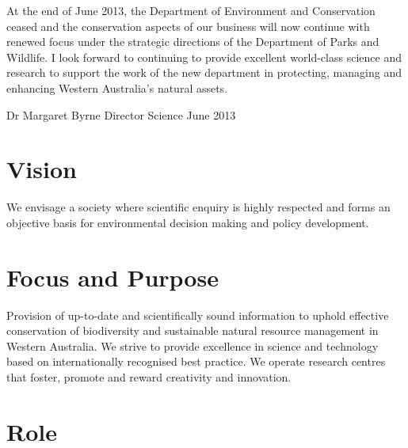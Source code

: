 \documentclass[version=last, paper=a4, DIV=18, usenames, dvipsnames]{scrartcl}
\begin{document}
At the end of June 2013, the Department of Environment and Conservation ceased and the conservation aspects of our business will now continue with renewed focus under the strategic directions of the Department of Parks and Wildlife. I look forward to continuing to provide excellent world-class science and research to support the work of the new department in protecting, managing and enhancing Western Australia's natural assets.


Dr Margaret Byrne
Director Science
June 2013




\clearpage

    

\section{Vision}



We envisage a society where scientific enquiry is highly respected and forms an objective basis for environmental decision making and policy development.




\clearpage

    

\section{Focus and Purpose}



Provision of up-to-date and scientifically sound information to uphold effective conservation of biodiversity and sustainable natural resource management in Western Australia. We strive to provide excellence in science and technology based on internationally recognised best practice. We operate research centres that foster, promote and reward creativity and innovation.




\clearpage

    

\section{Role}
\end{document}
